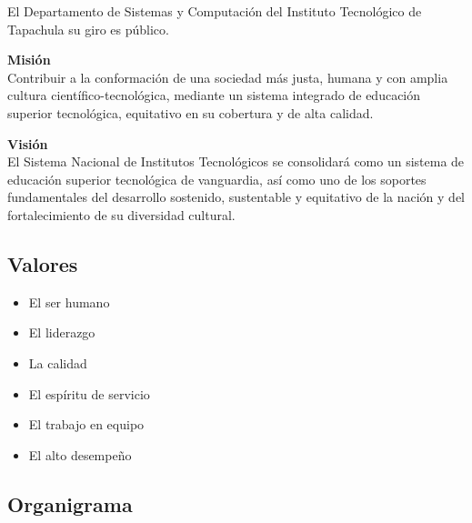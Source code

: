 El Departamento de Sistemas y Computación del Instituto Tecnológico de Tapachula su giro es público.\\


\parbox[t]{0.43\textwidth}{
{\setlength{\baselineskip}{1\baselineskip}
\textbf{Misión}\\
Contribuir a la conformación de una sociedad más justa, humana y con amplia cultura científico-tecnológica, mediante un sistema integrado de educación superior tecnológica, equitativo en su cobertura y de alta calidad.\par}
}\hfill
\parbox[t]{0.55\textwidth}{
{\setlength{\baselineskip}{1\baselineskip}
\textbf{Visión}\\
El Sistema Nacional de Institutos Tecnológicos se consolidará como un sistema de educación superior tecnológica de vanguardia, así como uno de los soportes fundamentales del desarrollo sostenido, sustentable y equitativo de la nación y del fortalecimiento de su diversidad cultural.\par}
}

\subsection*{Valores}
\begin{multicols}{3}
\begin{itemize}
\item El ser humano
\item El liderazgo
\item La calidad
\item El espíritu de servicio
\item El trabajo en equipo
\item El alto desempeño
\end{itemize}
\end{multicols}


\subsection*{Organigrama}



